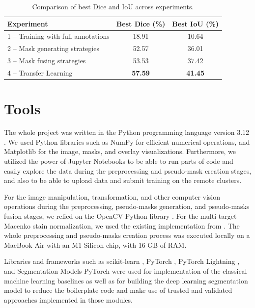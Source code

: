 \begin{table}[H]
  \centering
  \caption{Comparison of best Dice and IoU across experiments.}
  \begin{tabular}{ l | c | c } 
    \hline
    \textbf{Experiment}                                  & \textbf{Best Dice (\%)} & \textbf{Best IoU (\%)} \\
    \hline
    1 – Training with full annotations                   & 18.91                   & 10.64                  \\
    2 – Mask generating strategies                       & 52.57                   & 36.01                  \\
    3 – Mask fusing strategies                           & 53.53                   & 37.42                  \\
    4 – Transfer Learning                                & \textbf{57.59}          & \textbf{41.45}          \\
    \hline
  \end{tabular}
  \label{tab:summary-experiments}
\end{table}


\section{Tools}
The whole project was written in the Python programming language version 3.12  \cite{python}. We used Python libraries such as NumPy \cite{numpy} for efficient numerical operations, and Matplotlib \cite{matplotlib} for the image, masks, and overlay visualizations. Furthermore, we utilized the power of Jupyter Notebooks \cite{jupyter} to be able to run parts of code and easily explore the data during the preprocessing and pseudo-mask creation stages, and also to be able to upload data and submit training on the remote clusters.

For the image manipulation, transformation, and other computer vision operations during the preprocessing, pseudo-masks generation, and pseudo-masks fusion stages, we relied on the OpenCV Python library \cite{open-cv}. For the multi-target Macenko stain normalization, we used the existing implementation from \cite{torchstain}. The whole preprocessing and pseudo-masks creation process was executed locally on a MacBook Air with an M1 Silicon chip, with 16 GB of RAM.

Libraries and frameworks such as scikit-learn \cite{scikit-learn}, PyTorch \cite{pytorch}, PyTorch Lightning \cite{pytorch-ligthning}, and Segmentation Models PyTorch \cite{smp} were used for implementation of the classical machine learning baselines as well as for building the deep learning segmentation model to reduce the boilerplate code and make use of trusted and validated approaches implemented in those modules.

